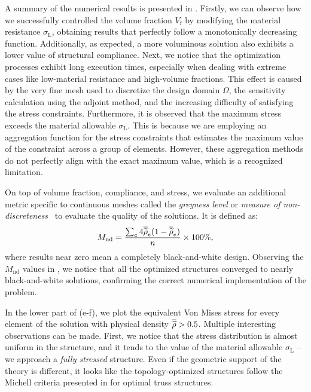 A summary of the numerical results is presented in . Firstly, we can observe how we successfully controlled the volume fraction $V_\text{f}$ by modifying the material resistance $\sigma_\text{L}$, obtaining results that perfectly follow a monotonically decreasing function. Additionally, as expected, a more voluminous solution also exhibits a lower value of structural compliance. Next, we notice that the optimization processes exhibit long execution times, especially when dealing with extreme cases like low-material resistance and high-volume fractions. This effect is caused by the very fine mesh used to discretize the design domain $\Omega$, the sensitivity calculation using the adjoint method, and the increasing difficulty of satisfying the stress constraints. Furthermore, it is observed that the maximum stress exceeds the material allowable $\sigma_\text{L}$. This is because we are employing an aggregation function for the stress constraints that estimates the maximum value of the constraint across a group of elements. However, these aggregation methods do not perfectly align with the exact maximum value, which is a recognized limitation.

On top of volume fraction, compliance, and stress, we evaluate an additional metric specific to continuous meshes called the \textit{greyness level} or \textit{measure of non-discreteness}~ to evaluate the quality of the solutions. It is defined as:
\begin{equation}
    M_\text{nd} = \frac{\sum_e 4 \overline{\widetilde{\rho}}_e(1-\overline{\widetilde{\rho}}_e)}{n} \times 100 \%,
\end{equation}
where results near zero mean a completely black-and-white design. Observing the $M_\text{nd}$ values in , we notice that all the optimized structures converged to nearly black-and-white solutions, confirming the correct numerical implementation of the problem.

In the lower part of  (e-f), we plot the equivalent Von Mises stress for every element of the solution with physical density $\overline{\widetilde{\rho}}>0.5$. Multiple interesting observations can be made. First, we notice that the stress distribution is almost uniform in the structure, and it tends to the value of the material allowable $\sigma_\text{L}$ -- \ie we approach a \textit{fully stressed} structure. Even if the geometric support of the theory is different, it looks like the topology-optimized structures follow the Michell criteria presented in  for optimal truss structures. 

